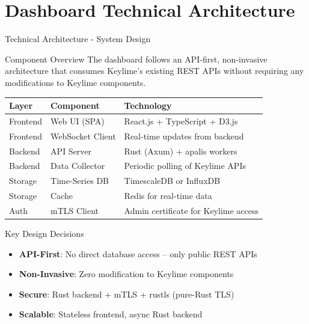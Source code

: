 \section{Dashboard Technical Architecture}

\begin{frame}{Technical Architecture - System Design}
  \begin{block}{Component Overview}
    \scriptsize
    The dashboard follows an API-first, non-invasive architecture that
    consumes Keylime's existing REST APIs without requiring any
    modifications to Keylime components.
  \end{block}

  \vspace{0.1cm}

  \begin{center}
    \scriptsize
    \begin{tabular}{|l|l|p{5cm}|}
      \hline
      \textbf{Layer} & \textbf{Component} & \textbf{Technology} \\
      \hline
      \hline
      Frontend & Web UI (SPA) & React.js + TypeScript + D3.js \\
      \hline
      Frontend & WebSocket Client & Real-time updates from backend \\
      \hline
      Backend & API Server & Rust (Axum) + apalis workers \\
      \hline
      Backend & Data Collector & Periodic polling of Keylime APIs \\
      \hline
      Storage & Time-Series DB & TimescaleDB or InfluxDB \\
      \hline
      Storage & Cache & Redis for real-time data \\
      \hline
      Auth & mTLS Client & Admin certificate for Keylime access \\
      \hline
    \end{tabular}
  \end{center}

  \vspace{0.2cm}

  \begin{alertblock}{Key Design Decisions}
    \scriptsize
    \begin{itemize}
      \item \textbf{API-First}: No direct database access -- only public REST APIs
      \item \textbf{Non-Invasive}: Zero modification to Keylime components
      \item \textbf{Secure}: Rust backend + mTLS + rustls (pure-Rust TLS)
      \item \textbf{Scalable}: Stateless frontend, async Rust backend
    \end{itemize}
  \end{alertblock}
\end{frame}

